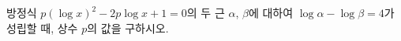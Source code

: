 방정식 $p(\log x)^2-2p\log x+1=0$의 두 근 $\alpha$, $\beta$에 대하여 $\log\alpha-\log\beta=4$가 성립할 때, 상수 $p$의 값을 구하시오.
